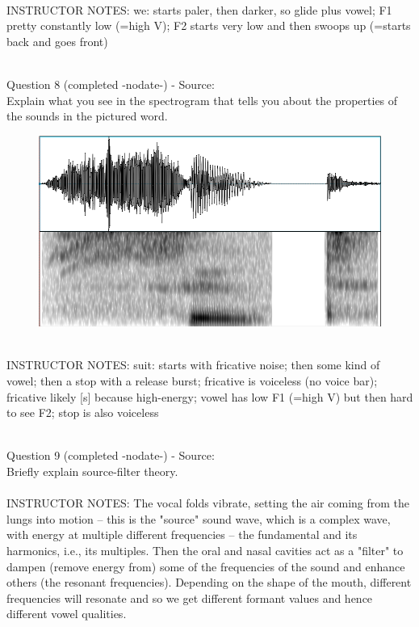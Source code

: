 \documentclass[12pt]{article}
\begin{document}
~\\
INSTRUCTOR NOTES: we: starts paler, then darker, so glide plus vowel; F1 pretty constantly low (=high V); F2 starts very low and then swoops up (=starts back and goes front)


~\\

{\large Question 8} (completed -nodate-) - Source: \\

Explain what you see in the spectrogram that tells you about the properties of the sounds in the pictured word.\\

\begin{figure}[H]
\includegraphics{../images/spectrogram_suit.png}
\end{figure}

~\\
INSTRUCTOR NOTES: suit: starts with fricative noise; then some kind of vowel; then a stop with a release burst; fricative is voiceless (no voice bar); fricative likely [s] because high-energy; vowel has low F1 (=high V) but then hard to see F2; stop is also voiceless


~\\

{\large Question 9} (completed -nodate-) - Source: \\

Briefly explain source-filter theory.\\


~\\
INSTRUCTOR NOTES: The vocal folds vibrate, setting the air coming from the lungs into motion -- this is the "source" sound wave, which is a complex wave, with energy at multiple different frequencies – the fundamental and its harmonics, i.e., its multiples. Then the oral and nasal cavities act as a "filter" to dampen (remove energy from) some of the frequencies of the sound and enhance others (the resonant frequencies). Depending on the shape of the mouth, different frequencies will resonate and so we get different formant values and hence different vowel qualities.
\end{document}
